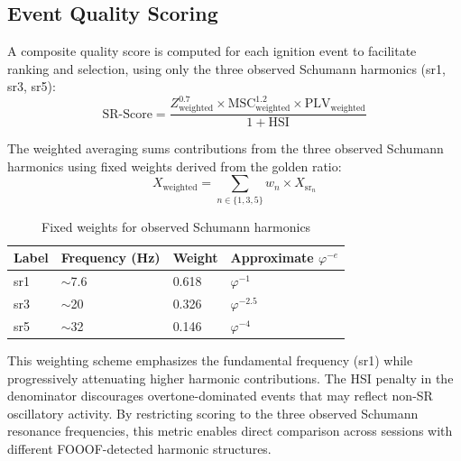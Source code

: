 \documentclass[11pt,a4paper]{article}
\begin{document}
\subsection{Event Quality Scoring}
A composite quality score is computed for each ignition event to facilitate ranking and selection, using only the three observed Schumann harmonics (sr1, sr3, sr5):
\begin{displaymath}
\text{SR-Score} = \frac{Z_{\text{weighted}}^{0.7} \times \text{MSC}_{\text{weighted}}^{1.2} \times \text{PLV}_{\text{weighted}}}{1 + \text{HSI}}
\end{displaymath}
\begin{table}[H]
    \centering
     \end{table}
The weighted averaging sums contributions from the three observed Schumann harmonics using fixed weights derived from the golden ratio:
\begin{displaymath}
X_{\text{weighted}} = \sum_{n \in \{1,3,5\}} w_n \times X_{\text{sr}_n}
\end{displaymath}
\begin{table}[H]
    \centering
    \caption{Fixed weights for observed Schumann harmonics}
    \begin{tabular}{llll}
        \toprule
        Label & Frequency (Hz) & Weight & Approximate $\varphi^{-e}$ \\
        \midrule
        sr1 & $\sim$7.6 & 0.618 & $\varphi^{-1}$ \\
        sr3 & $\sim$20 & 0.326 & $\varphi^{-2.5}$ \\
        sr5 & $\sim$32 & 0.146 & $\varphi^{-4}$ \\
        \bottomrule
    \end{tabular}
\end{table}
This weighting scheme emphasizes the fundamental frequency (sr1) while progressively attenuating higher harmonic contributions. The HSI penalty in the denominator discourages overtone-dominated events that may reflect non-SR oscillatory activity. By restricting scoring to the three observed Schumann resonance frequencies, this metric enables direct comparison across sessions with different FOOOF-detected harmonic structures.
\end{document}

